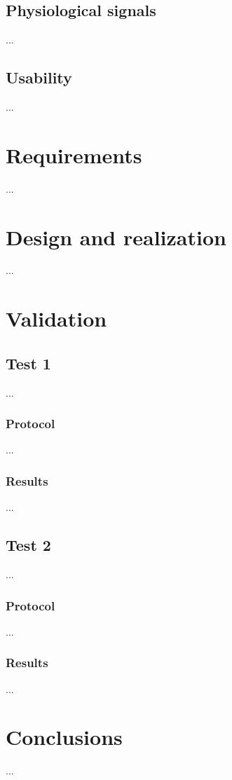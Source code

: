 \documentclass[binding=0.6cm,LaM]{sapthesis}
\begin{document}
\section{Physiological signals}
...
\section{Usability}
...


\chapter{Requirements}
...
	
	
\chapter{Design and realization}
...


\chapter{Validation}
\section{Test 1}
...
\subsection{Protocol}
...
\subsection{Results}
...
\section{Test 2}
...
\subsection{Protocol}
...
\subsection{Results}
...
\chapter{Conclusions}
...
\backmatter
\cleardoublepage
{} %


\end{document}
